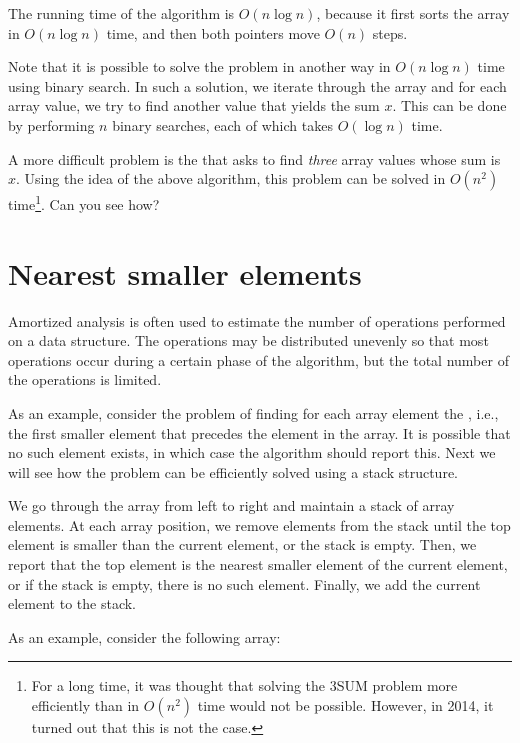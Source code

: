 The running time of the algorithm is
$O(n \log n)$, because it first sorts
the array in $O(n \log n)$ time,
and then both pointers move $O(n)$ steps.

Note that it is possible to solve the problem
in another way in $O(n \log n)$ time using binary search.
In such a solution, we iterate through the array
and for each array value, we try to find another
value that yields the sum $x$.
This can be done by performing $n$ binary searches,
each of which takes $O(\log n)$ time.

A more difficult problem is 
the  that asks to
find \emph{three} array values
whose sum is $x$.
Using the idea of the above algorithm,
this problem can be solved in $O(n^2)$ time\footnote{For a long time,
it was thought that solving
the 3SUM problem more efficiently than in $O(n^2)$ time
would not be possible.
However, in 2014, it turned out \cite{gro14}
that this is not the case.}.
Can you see how?

\section{Nearest smaller elements}


Amortized analysis is often used to
estimate the number of operations
performed on a data structure.
The operations may be distributed unevenly so
that most operations occur during a
certain phase of the algorithm, but the total
number of the operations is limited.

As an example, consider the problem
of finding for each array element
the , i.e.,
the first smaller element that precedes the element
in the array.
It is possible that no such element exists,
in which case the algorithm should report this.
Next we will see how the problem can be
efficiently solved using a stack structure.

We go through the array from left to right
and maintain a stack of array elements.
At each array position, we remove elements from the stack
until the top element is smaller than the
current element, or the stack is empty.
Then, we report that the top element is
the nearest smaller element of the current element,
or if the stack is empty, there is no such element.
Finally, we add the current element to the stack.

As an example, consider the following array:
\begin{center}
\end{center}


